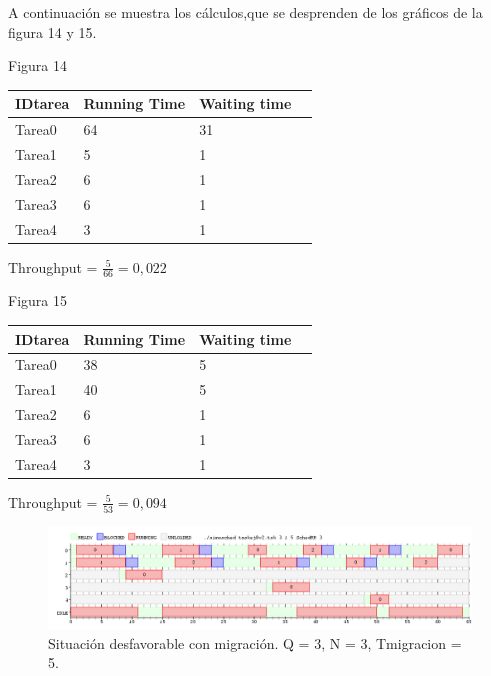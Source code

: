 \documentclass[10pt, a4paper]{article}
\begin{document}
A continuación se muestra los cálculos,que se desprenden de los gráficos de la figura 14 y 15.

\begin{center}
Figura 14
\end{center}

\begin{center}
  
\begin{tabular}{| l | l | l | l |}    
    \hline
    IDtarea &  Running Time & Waiting time\\ \hline
    Tarea0 & 	64 & 31   \\ \hline
    Tarea1 & 	5 & 1 \\ \hline
    Tarea2 &	6 & 1 \\ \hline
    Tarea3 &	6 & 1 \\ \hline
    Tarea4 &	3& 1 \\ \hline
   
\end{tabular}
\end{center}


\begin{center}
Throughput = $\frac{5}{66} = 0,022$
\end{center}



\begin{center}
Figura 15
\end{center}

\begin{center}
\begin{tabular}{| l | l | l | l |}
    \hline
    IDtarea &  Running Time & Waiting time\\ \hline
    Tarea0 & 	38 & 5 \\ \hline
    Tarea1 &	40 & 5 \\ \hline
    Tarea2 &	6 & 1 \\ \hline
    Tarea3 &	6 & 1 \\ \hline
    Tarea4 &	3& 1 \\ \hline
   
   
\end{tabular}
\end{center}


\begin{center}
Throughput = $\frac{5}{53} = 0,094$
\end{center}


\begin{figure}[H]
  	\centering
   	\includegraphics[width=1\textwidth]
   	 {imgs/8Migracion2.png}
	\caption{Situación desfavorable con migración. Q = 3, N = 3, Tmigracion = 5.}
\end{figure}
\end{document}
